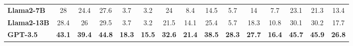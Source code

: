 \documentclass{article} %
\begin{document}
\begin{table}[htbp]
\begin{tabular}{l|ccccccccc|ccccc}
\textbf{Llama2-7B}   &28&24.4&27.6&3.7&3.2&24&8.4&14.5&5.7&14&7.7&23.1&21.3&13.4\\
\textbf{Llama2-13B}   &28.4&26&29.5&3.7&3.2&21.5&14.1&25.4&5.7&18.3&10.8&30.1&30.2&17.7\\
\textbf{GPT-3.5}  &\textbf{43.1}&\textbf{39.4}&\textbf{44.8}&\textbf{18.3}&\textbf{15.5}&\textbf{32.6}&\textbf{21.4}&\textbf{38.5}&\textbf{28.3}&\textbf{27.7}&\textbf{16.4}&\textbf{45.7}&\textbf{45.9}&\textbf{26.8}  \\
\hline
\end{tabular}
\vspace{-1em}
\label{tab:gpt_comp}
\end{table}
\end{document}
